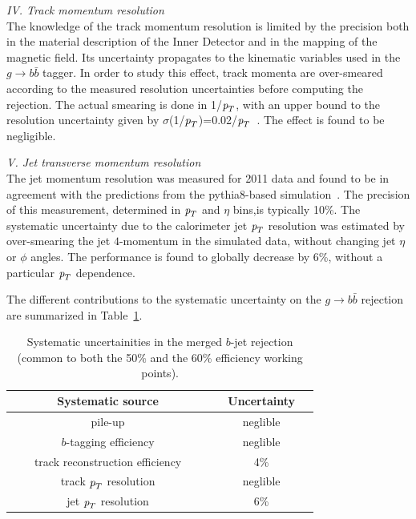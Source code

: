 \vspace{3mm}
{\em IV. Track momentum resolution}
\\[3mm]
The knowledge of the track momentum resolution is limited by the precision both in the material description of the Inner Detector and in the mapping of the magnetic field. Its uncertainty propagates to the kinematic variables used in the 
$g\rightarrow b \bar{b}$ tagger. In order to study this effect, track momenta are over-smeared according to the measured resolution uncertainties before computing the rejection. The actual smearing is done in 1/${\emph{p}_{T}}$, with an upper bound to the resolution uncertainty given by $\sigma$(1/${\emph{p}_{T}}$)=0.02/${\emph{p}_{T}}$~\cite{ATLAS-CONF-2010-009}. The effect is found to be negligible. %

\vspace{3mm}
{ \em V. Jet transverse momentum resolution}
\\[3mm]
The jet momentum resolution was measured for 2011 data and found to be in agreement with the predictions from the {\sc pythia8}-based simulation~\cite{JER2011}. The precision of this measurement, determined in ${\emph{p}_{T}}$ and $\eta$ bins,is typically 10\%.
The systematic uncertainty due to the calorimeter jet ${\emph{p}_{T}}$ resolution was estimated by over-smearing the jet $4$-momentum in the simulated data, without changing jet $\eta$ or $\phi$ angles. The performance is found to globally decrease by 6\%, without a particular ${\emph{p}_{T}}$ dependence.

\vspace{3mm}
The different contributions to the systematic uncertainty on the $g\rightarrow b \bar{b}$ rejection are summarized in Table~\ref{tb:systematics}.
\begin{table}[!hbt] %
\renewcommand{\arraystretch}{1.2}
\centering
\begin{tabular}{ | c | c |}
\hline
  ~~~~~~~Systematic source~~~~~~~ &~~Uncertainty~~\\ \hline
  pile-up          &  neglible     \\ 
  $b$-tagging efficiency     &  neglible     \\ 
  track reconstruction efficiency  &    4\%        \\ 
  track ${\emph{p}_{T}}$ resolution &  neglible     \\
  jet ${\emph{p}_{T}}$ resolution  &    6\%        \\ \hline 
\end{tabular}
\caption{Systematic uncertainities in the merged $b$-jet rejection (common to both the 50\% and the 60\% efficiency working points).}
\label{tb:systematics}
\end{table}

